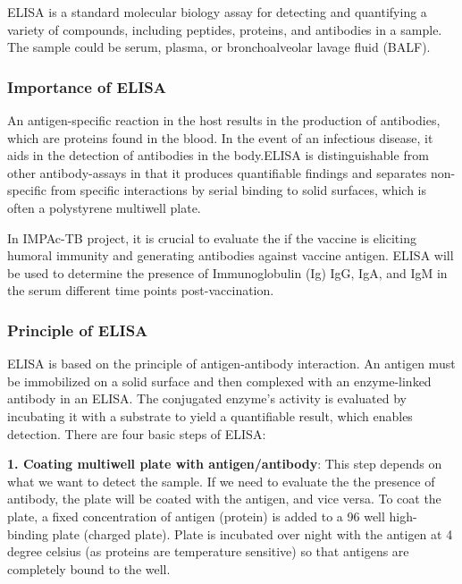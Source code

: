 \documentclass[
]{book}
\begin{document}
ELISA is a standard molecular biology assay for detecting and quantifying a variety of compounds, including peptides, proteins, and antibodies in a sample. The sample could be serum, plasma, or bronchoalveolar lavage fluid (BALF).

\hypertarget{importance-of-elisa}{%
\subsubsection{\texorpdfstring{\textbf{Importance of ELISA}}{Importance of ELISA}}\label{importance-of-elisa}}

An antigen-specific reaction in the host results in the production of antibodies, which are proteins found in the blood. In the event of an infectious disease, it aids in the detection of antibodies in the body.ELISA is distinguishable from other antibody-assays in that it produces quantifiable findings and separates non-specific from specific interactions by serial binding to solid surfaces, which is often a polystyrene multiwell plate.

In IMPAc-TB project, it is crucial to evaluate the if the vaccine is eliciting humoral immunity and generating antibodies against vaccine antigen. ELISA will be used to determine the presence of Immunoglobulin (Ig) IgG, IgA, and IgM in the serum different time points post-vaccination.

\hypertarget{principle-of-elisa}{%
\subsubsection{\texorpdfstring{\textbf{Principle of ELISA}}{Principle of ELISA}}\label{principle-of-elisa}}

ELISA is based on the principle of antigen-antibody interaction. An antigen must be immobilized on a solid surface and then complexed with an enzyme-linked antibody in an ELISA. The conjugated enzyme's activity is evaluated by incubating it with a substrate to yield a quantifiable result, which enables detection. There are four basic steps of ELISA:

\textbf{1. Coating multiwell plate with antigen/antibody}: This step depends on what we want to detect the sample. If we need to evaluate the the presence of antibody, the plate will be coated with the antigen, and vice versa. To coat the plate, a fixed concentration of antigen (protein) is added to a 96 well high-binding plate (charged plate). Plate is incubated over night with the antigen at 4 degree celsius (as proteins are temperature sensitive) so that antigens are completely bound to the well.
\end{document}
